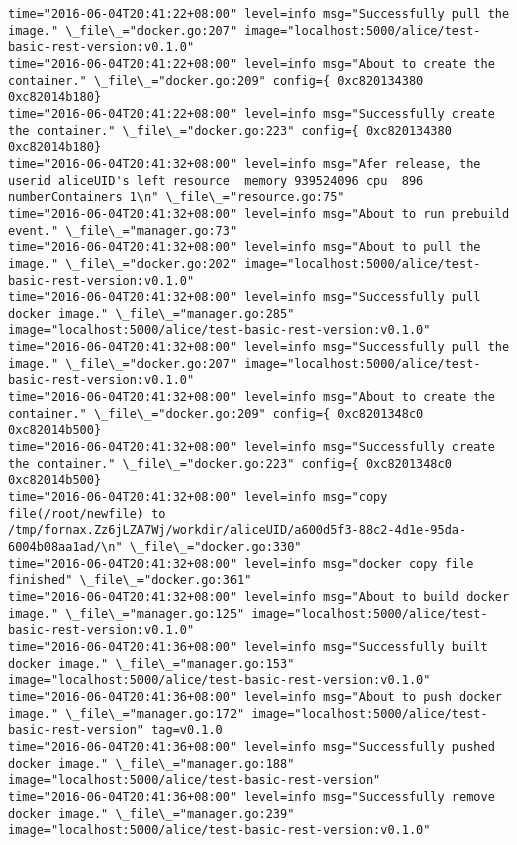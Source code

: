 \begin{lstlisting}[caption={Fornax功能性测试日志}]
time="2016-06-04T20:41:22+08:00" level=info msg="Successfully pull the image." \_file\_="docker.go:207" image="localhost:5000/alice/test-basic-rest-version:v0.1.0" 
time="2016-06-04T20:41:22+08:00" level=info msg="About to create the container." \_file\_="docker.go:209" config={ 0xc820134380 0xc82014b180} 
time="2016-06-04T20:41:22+08:00" level=info msg="Successfully create the container." \_file\_="docker.go:223" config={ 0xc820134380 0xc82014b180} 
time="2016-06-04T20:41:32+08:00" level=info msg="Afer release, the userid aliceUID's left resource  memory 939524096 cpu  896 numberContainers 1\n" \_file\_="resource.go:75" 
time="2016-06-04T20:41:32+08:00" level=info msg="About to run prebuild event." \_file\_="manager.go:73" 
time="2016-06-04T20:41:32+08:00" level=info msg="About to pull the image." \_file\_="docker.go:202" image="localhost:5000/alice/test-basic-rest-version:v0.1.0" 
time="2016-06-04T20:41:32+08:00" level=info msg="Successfully pull docker image." \_file\_="manager.go:285" image="localhost:5000/alice/test-basic-rest-version:v0.1.0" 
time="2016-06-04T20:41:32+08:00" level=info msg="Successfully pull the image." \_file\_="docker.go:207" image="localhost:5000/alice/test-basic-rest-version:v0.1.0" 
time="2016-06-04T20:41:32+08:00" level=info msg="About to create the container." \_file\_="docker.go:209" config={ 0xc8201348c0 0xc82014b500} 
time="2016-06-04T20:41:32+08:00" level=info msg="Successfully create the container." \_file\_="docker.go:223" config={ 0xc8201348c0 0xc82014b500} 
time="2016-06-04T20:41:32+08:00" level=info msg="copy file(/root/newfile) to /tmp/fornax.Zz6jLZA7Wj/workdir/aliceUID/a600d5f3-88c2-4d1e-95da-6004b08aa1ad/\n" \_file\_="docker.go:330" 
time="2016-06-04T20:41:32+08:00" level=info msg="docker copy file finished" \_file\_="docker.go:361" 
time="2016-06-04T20:41:32+08:00" level=info msg="About to build docker image." \_file\_="manager.go:125" image="localhost:5000/alice/test-basic-rest-version:v0.1.0" 
time="2016-06-04T20:41:36+08:00" level=info msg="Successfully built docker image." \_file\_="manager.go:153" image="localhost:5000/alice/test-basic-rest-version:v0.1.0" 
time="2016-06-04T20:41:36+08:00" level=info msg="About to push docker image." \_file\_="manager.go:172" image="localhost:5000/alice/test-basic-rest-version" tag=v0.1.0 
time="2016-06-04T20:41:36+08:00" level=info msg="Successfully pushed docker image." \_file\_="manager.go:188" image="localhost:5000/alice/test-basic-rest-version" 
time="2016-06-04T20:41:36+08:00" level=info msg="Successfully remove docker image." \_file\_="manager.go:239" image="localhost:5000/alice/test-basic-rest-version:v0.1.0" 

\end{lstlisting}
